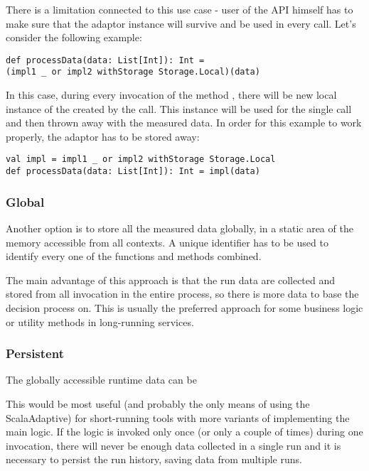 There is a limitation connected to this use case - user of the API himself has to make sure that the adaptor instance will survive and be used in every call. Let's consider the following example:

\lstset{style=Scala}
\begin{lstlisting}
def processData(data: List[Int]): Int = 
(impl1 _ or impl2 withStorage Storage.Local)(data)
\end{lstlisting}

In this case, during every invocation of the method , there will be new local instance of the  created by the  call. This instance will be used for the single call and then thrown away with the measured data. In order for this example to work properly, the adaptor has to be stored away:

\lstset{style=Scala}
\begin{lstlisting}
val impl = impl1 _ or impl2 withStorage Storage.Local
def processData(data: List[Int]): Int = impl(data)
\end{lstlisting}

\subsubsection{Global}

Another option is to store all the measured data globally, in a static area of the memory accessible from all contexts. A unique identifier has to be used to identify every one of the functions and methods combined.

The main advantage of this approach is that the run data are collected and stored from all invocation in the entire process, so there is more data to base the decision process on. This is usually the preferred approach for some business logic or utility methods in long-running services.

\subsubsection{Persistent}

The globally accessible runtime data can be 

This would be most useful (and probably the only means of using the ScalaAdaptive) for short-running tools with more variants of implementing the main logic. If the logic is invoked only once (or only a couple of times) during one invocation, there will never be enough data collected in a single run and it is necessary to persist the run history, saving data from multiple runs.

